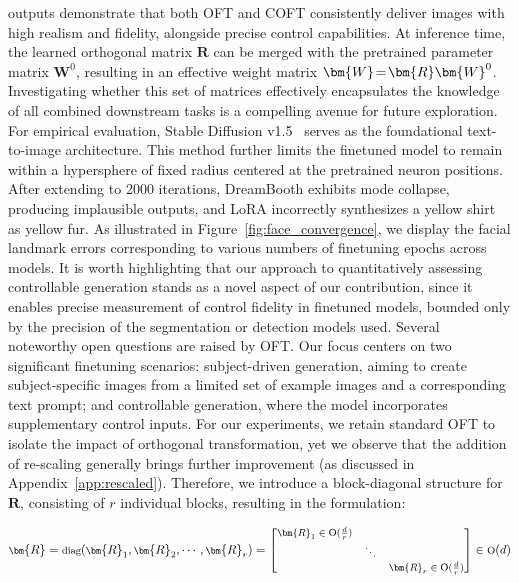 {outputs demonstrate that both OFT and COFT consistently deliver images with high realism and fidelity, alongside precise control capabilities. At inference time, the learned orthogonal matrix $\bm{R}$ can be merged with the pretrained parameter matrix $\bm{W}^0$, resulting in an effective weight matrix $\thickmuskip=2mu \medmuskip=2mu \bm{W}=\bm{R}\bm{W}^0$. Investigating whether this set of matrices effectively encapsulates the knowledge of all combined downstream tasks is a compelling avenue for future exploration. For empirical evaluation, Stable Diffusion v1.5~\cite{rombach2022high} serves as the foundational text-to-image architecture. This method further limits the finetuned model to remain within a hypersphere of fixed radius centered at the pretrained neuron positions. After extending to 2000 iterations, DreamBooth exhibits mode collapse, producing implausible outputs, and LoRA incorrectly synthesizes a yellow shirt as yellow fur. As illustrated in Figure~\ref{fig:face_convergence}, we display the facial landmark errors corresponding to various numbers of finetuning epochs across models. It is worth highlighting that our approach to quantitatively assessing controllable generation stands as a novel aspect of our contribution, since it enables precise measurement of control fidelity in finetuned models, bounded only by the precision of the segmentation or detection models used. Several noteworthy open questions are raised by OFT. Our focus centers on two significant finetuning scenarios: subject-driven generation, aiming to create subject-specific images from a limited set of example images and a corresponding text prompt; and controllable generation, where the model incorporates supplementary control inputs. For our experiments, we retain standard OFT to isolate the impact of orthogonal transformation, yet we observe that the addition of re-scaling generally brings further improvement (as discussed in Appendix~\ref{app:rescaled}). Therefore, we introduce a block-diagonal structure for $\bm{R}$, consisting of $r$ individual blocks, resulting in the formulation:

\begin{equation}
    \footnotesize
    \bm{R}=\text{diag}(\bm{R}_1,\bm{R}_2,\cdots,\bm{R}_r)=\begin{bmatrix}
    \bm{R}_1\in \text{O}(\frac{d}{r}) &  &\\
    &\ddots & \\
    & & \bm{R}_r\in \text{O}(\frac{d}{r})
    \end{bmatrix}\in \text{O}(d)
\end{equation}

}
